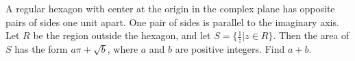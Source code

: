 A regular hexagon with center at the origin in the complex plane has opposite pairs of sides one unit apart. One pair of sides is parallel to the imaginary axis. Let $ R$ be the region outside the hexagon, and let $ S=\{\frac{1}{z}|z\in R\}$. Then the area of $ S$ has the form $ a\pi+\sqrt{b}$, where $ a$ and $ b$ are positive integers. Find $ a+b$.